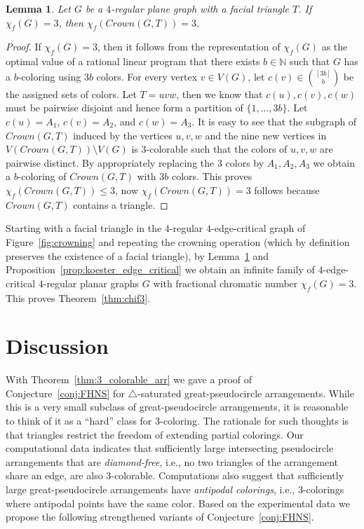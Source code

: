 \documentclass[fontsize=11pt,a4paper,DIV12]{scrartcl}
\newcommand{\crown}[2]{\mathit{Crown}(#1,#2)}
\newtheorem{lemma}[theorem]{Lemma}
\begin{document}
\begin{lemma}\label{lem:crowning_chi_f}
  Let $G$ be a $4$-regular plane graph with a facial triangle $T$.  If
  $\chi_f(G)=3$, then $\chi_f(\crown{G}{T})=3$.
\end{lemma}
\begin{proof}
  If $\chi_f(G)=3$, then it follows from the representation of $\chi_f(G)$ as
  the optimal value of a rational linear program that there exists
  $b \in \mathbb{N}$ such that $G$ has a $b$-coloring using $3b$ colors. For
  every vertex $v \in V(G)$, let $c(v) \in \binom{[3b]}{b}$ be the assigned
  sets of colors. Let $T=uvw$, then we know that $c(u), c(v), c(w)$ must be
  pairwise disjoint and hence form a partition of $\{1,\ldots,3b\}$. Let
  $c(u)=A_1$, $c(v)=A_2$, and $c(w)=A_3$. It is easy to see that the subgraph
  of $\crown{G}{T}$ induced by the vertices $u,v,w$ and the nine new vertices in
  $V(\crown{G}{T}) \setminus V(G)$ is 3-colorable such that the colors of $u,v,w$
  are pairwise distinct. By appropriately replacing the 3 colors by $A_1,A_2,A_3$
  we obtain a $b$-coloring of $\crown{G}{T}$ with $3b$ colors. This proves
  $\chi_f(\crown{G}{T}) \le 3$, now $\chi_f(\crown{G}{T}) = 3$ follows because $\crown{G}{T}$
  contains a triangle.
\end{proof}

Starting with a facial triangle in the $4$-regular $4$-edge-critical graph
of Figure~\ref{fig:crowning} and repeating the crowning operation
(which by definition preserves the existence of a facial triangle), by
Lemma~\ref{lem:crowning_chi_f} and
Proposition~\ref{prop:koester_edge_critical} we obtain an infinite family of
$4$-edge-critical $4$-regular planar graphs $G$ with fractional chromatic
number $\chi_f(G)=3$. This proves Theorem~\ref{thm:chif3}.

\section{Discussion}
\label{sec:discussion}

With Theorem~\ref{thm:3_colorable_arr} we gave a proof of
Conjecture~\ref{conj:FHNS} for $\triangle$-saturated great-pseudocircle
arrangements. While this is a very small subclass of great-pseudocircle
arrangements, it is reasonable to think of it as a ``hard'' class for
3-coloring.  The rationale for such thoughts is that triangles restrict the
freedom of extending partial colorings.  Our computational data indicates that
sufficiently large intersecting pseudocircle arrangements that are
\emph{diamond-free}, i.e., no two triangles of the arrangement share an edge,
are also 3-colorable.  Computations also suggest that sufficiently large
great-pseudocircle arrangements have \emph{antipodal colorings}, i.e.,
3-colorings where antipodal points have the same color.  Based on the
experimental data we propose the following strengthened variants of
Conjecture~\ref{conj:FHNS}.
\end{document}
